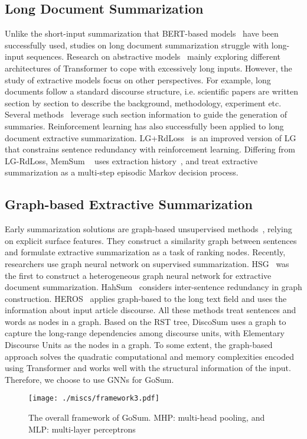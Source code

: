 \subsection{Long Document Summarization}
Unlike the short-input summarization that BERT-based models~\cite{2019_bertsum} have been successfully used, studies on long document summarization struggle with long-input sequences. 
Research on abstractive models~\cite{bigbrid_2020,hepo_2021} mainly exploring different architectures of Transformer to cope with excessively long inputs.
However, the study of extractive models focus on other perspectives.
For example, long documents follow a standard discourse structure, i.e. scientific papers are written section by section to describe the background, methodology, experiment etc.
Several methods~\cite {localglobal_2019,collins2017supervised,discourse_2021} leverage such section information to guide the generation of summaries.
Reinforcement learning has also successfully been applied to long document extractive summarization.
LG+RdLoss~\cite{rdloss_2020} is an improved version of LG~\cite{localglobal_2019} that constrains sentence redundancy with reinforcement learning.
Differing from LG-RdLoss, MemSum ~\cite{memsum_2022} uses extraction history~\cite{neusumm_history_2018}, and treat extractive summarization as a multi-step episodic Markov decision process.

\subsection{Graph-based Extractive Summarization}
Early summarization solutions are graph-based unsupervised methods~\cite{graph0_2004}, relying on explicit surface features. They construct a similarity graph between sentences and formulate extractive summarization as a task of ranking nodes.
Recently, researchers use graph neural network on supervised summarization.
HSG~\cite{hsg_2020} was the first  to construct a heterogeneous graph neural network for extractive document summarization.
HahSum~\cite{hahsum_2020} considers inter-sentence redundancy in graph construction.
HEROS~\cite{discourse_2021} applies graph-based to the long text field and uses the information about input article discourse.
All these methods treat sentences and words as nodes in a graph.
Based on the RST tree, DiscoSum\cite{disco_2020} uses a graph  to capture the long-range dependencies among discourse units,  with  Elementary Discourse Units as the nodes in a graph.
 To some extent, the graph-based approach solves the quadratic computational and memory complexities encoded using Transformer and works well with the structural information of the input. Therefore, we choose to use GNNs for GoSum.
\begin{figure*}[htp]
    \centering
    \texttt{[image: ./miscs/framework3.pdf]}
    \caption{The overall framework of GoSum. MHP: multi-head pooling, and MLP: multi-layer perceptrons }
    \label{fig_framework}
\end{figure*}

